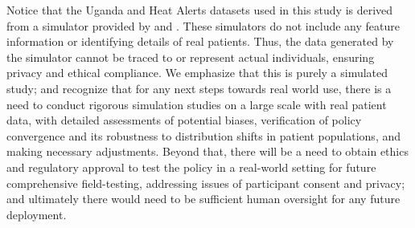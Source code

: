 Notice that the Uganda and Heat Alerts datasets used in this study is derived from a simulator provided by \citet{boehmer2024optimizing} and \citet{considine2023optimizing}. These simulators do not include any feature information or identifying details of real patients. Thus, the data generated by the simulator cannot be traced to or represent actual individuals, ensuring privacy and ethical compliance. We emphasize that this is purely a simulated study; and recognize that for any next steps towards real world use, there is a need to conduct rigorous simulation studies on a large scale with real patient data, with detailed assessments of potential biases, verification of policy convergence and its robustness to distribution shifts in patient populations, and making necessary adjustments. Beyond that, there will be a need to obtain ethics and regulatory approval to test the policy in a real-world setting for future comprehensive field-testing, addressing issues of participant consent and privacy; and ultimately there would need to be sufficient human oversight for any future deployment.